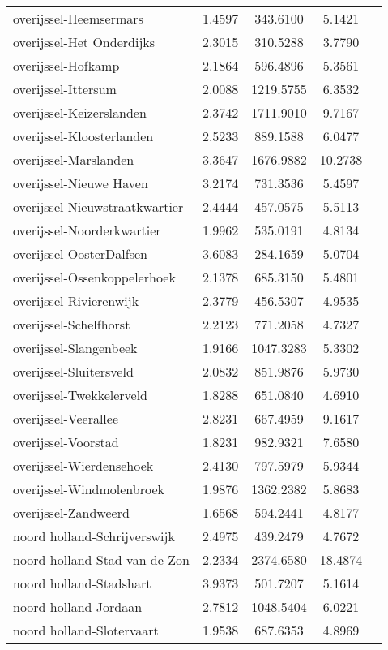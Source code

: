 \begin{longtable}{llccc}
overijssel-Heemsermars & 1.4597 & 343.6100 & 5.1421 \\
overijssel-Het Onderdijks & 2.3015 & 310.5288 & 3.7790 \\
overijssel-Hofkamp & 2.1864 & 596.4896 & 5.3561 \\
overijssel-Ittersum & 2.0088 & 1219.5755 & 6.3532 \\
overijssel-Keizerslanden & 2.3742 & 1711.9010 & 9.7167 \\
overijssel-Kloosterlanden & 2.5233 & 889.1588 & 6.0477 \\
overijssel-Marslanden & 3.3647 & 1676.9882 & 10.2738 \\
overijssel-Nieuwe Haven & 3.2174 & 731.3536 & 5.4597 \\
overijssel-Nieuwstraatkwartier & 2.4444 & 457.0575 & 5.5113 \\
overijssel-Noorderkwartier & 1.9962 & 535.0191 & 4.8134 \\
overijssel-OosterDalfsen & 3.6083 & 284.1659 & 5.0704 \\
overijssel-Ossenkoppelerhoek & 2.1378 & 685.3150 & 5.4801 \\
overijssel-Rivierenwijk & 2.3779 & 456.5307 & 4.9535 \\
overijssel-Schelfhorst & 2.2123 & 771.2058 & 4.7327 \\
overijssel-Slangenbeek & 1.9166 & 1047.3283 & 5.3302 \\
overijssel-Sluitersveld & 2.0832 & 851.9876 & 5.9730 \\
overijssel-Twekkelerveld & 1.8288 & 651.0840 & 4.6910 \\
overijssel-Veerallee & 2.8231 & 667.4959 & 9.1617 \\
overijssel-Voorstad & 1.8231 & 982.9321 & 7.6580 \\
overijssel-Wierdensehoek & 2.4130 & 797.5979 & 5.9344 \\
overijssel-Windmolenbroek & 1.9876 & 1362.2382 & 5.8683 \\
overijssel-Zandweerd & 1.6568 & 594.2441 & 4.8177 \\
noord holland-Schrijverswijk & 2.4975 & 439.2479 & 4.7672 \\
noord holland-Stad van de Zon & 2.2334 & 2374.6580 & 18.4874 \\
noord holland-Stadshart & 3.9373 & 501.7207 & 5.1614 \\
noord holland-Jordaan & 2.7812 & 1048.5404 & 6.0221 \\
noord holland-Slotervaart & 1.9538 & 687.6353 & 4.8969 \\

\end{longtable}
